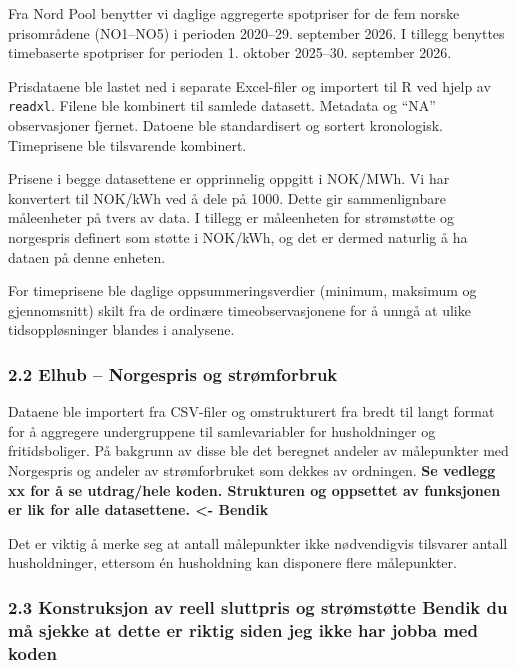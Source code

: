 \documentclass[
  letterpaper,
  DIV=11,
  numbers=noendperiod]{scrartcl}
\begin{document}
Fra Nord Pool benytter vi daglige aggregerte spotpriser for de fem
norske prisområdene (NO1--NO5) i perioden 2020--29. september 2026. I
tillegg benyttes timebaserte spotpriser for perioden 1. oktober
2025--30. september 2026.

Prisdataene ble lastet ned i separate Excel-filer og importert til R ved
hjelp av \texttt{readxl}. Filene ble kombinert til samlede datasett.
Metadata og ``NA'' observasjoner fjernet. Datoene ble standardisert og
sortert kronologisk. Timeprisene ble tilsvarende kombinert.

Prisene i begge datasettene er opprinnelig oppgitt i NOK/MWh. Vi har
konvertert til NOK/kWh ved å dele på 1000. Dette gir sammenlignbare
måleenheter på tvers av data. I tillegg er måleenheten for strømstøtte
og norgespris definert som støtte i NOK/kWh, og det er dermed naturlig å
ha dataen på denne enheten.

For timeprisene ble daglige oppsummeringsverdier (minimum, maksimum og
gjennomsnitt) skilt fra de ordinære timeobservasjonene for å unngå at
ulike tidsoppløsninger blandes i analysene.

\subsubsection{2.2 Elhub -- Norgespris og
strømforbruk}\label{elhub-norgespris-og-struxf8mforbruk}

Dataene ble importert fra CSV-filer og omstrukturert fra bredt til langt
format for å aggregere undergruppene til samlevariabler for
husholdninger og fritidsboliger. På bakgrunn av disse ble det beregnet
andeler av målepunkter med Norgespris og andeler av strømforbruket som
dekkes av ordningen. \textbf{Se vedlegg xx for å se utdrag/hele koden.
Strukturen og oppsettet av funksjonen er lik for alle datasettene.
\textless- Bendik}

Det er viktig å merke seg at antall målepunkter ikke nødvendigvis
tilsvarer antall husholdninger, ettersom én husholdning kan disponere
flere målepunkter.

\subsubsection{2.3 Konstruksjon av reell sluttpris og strømstøtte Bendik
du må sjekke at dette er riktig siden jeg ikke har jobba med
koden}\label{konstruksjon-av-reell-sluttpris-og-struxf8mstuxf8tte-bendik-du-muxe5-sjekke-at-dette-er-riktig-siden-jeg-ikke-har-jobba-med-koden}
\end{document}
